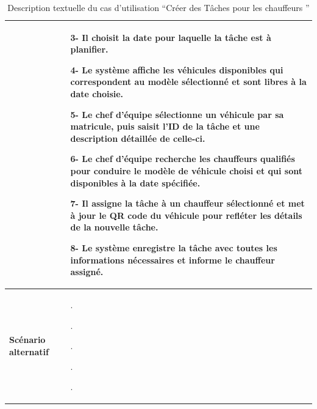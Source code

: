 \begin{table}[H]
  \centering
  \renewcommand{\arraystretch}{1} %
  \begin{tabular}{|p{4cm}|p{9cm}|}

                                 &   3- Il choisit la date pour laquelle la tâche est à planifier.\newline

                                 4- Le système affiche les véhicules disponibles qui correspondent au modèle sélectionné et sont libres à la date choisie.\newline
                             
                                 5- Le chef d'équipe sélectionne un véhicule par sa matricule, puis saisit l'ID de la tâche et une description détaillée de celle-ci. \newline
                                
                                6- Le chef d'équipe recherche les chauffeurs qualifiés pour conduire le modèle de véhicule choisi et qui sont disponibles à la date spécifiée.\newline

    7- Il assigne la tâche à un chauffeur sélectionné et met à jour le QR code du véhicule pour refléter les détails de la nouvelle tâche.\newline

    8- Le système enregistre la tâche avec toutes les informations nécessaires et informe le chauffeur assigné.                                                                           \\

    \hline
    \textbf{Scénario alternatif} &  .\newline

    .\newline

    .\newline

    .\newline
    
    .\\

    \hline
  \end{tabular}
  \caption{Description textuelle du cas d’utilisation “Créer des Tâches pour les chauffeurs ”}

\end{table}



